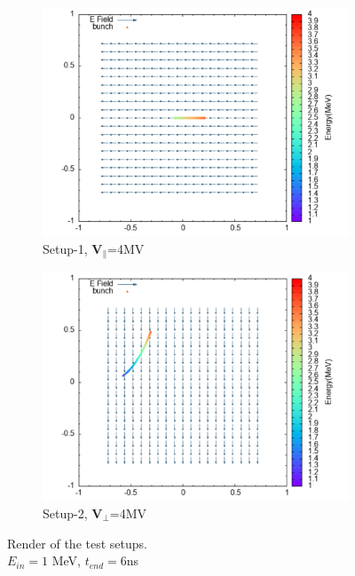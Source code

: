\documentclass{book}
\begin{document}
\begin{figure}[H]
    \centering
    \begin{subfigure}{0.9\textwidth}
        \centering
        \includegraphics[width=\linewidth]{../../../figures/rhodoSim/statE_par.png}
        \caption*{Setup-1, $\textbf{V}_{\parallel}$=4MV}
    \end{subfigure}
    \begin{subfigure}{0.9\textwidth}
        \centering
        \includegraphics[width=\linewidth]{../../../figures/rhodoSim/statE_perp.png}
        \caption*{Setup-2, $\textbf{V}_{\perp}$=4MV}
    \end{subfigure}
    \caption{Render of the test setups. \\ $E_{in}=1$ MeV, $t_{end}=6$ns}
\end{figure}
\end{document}
